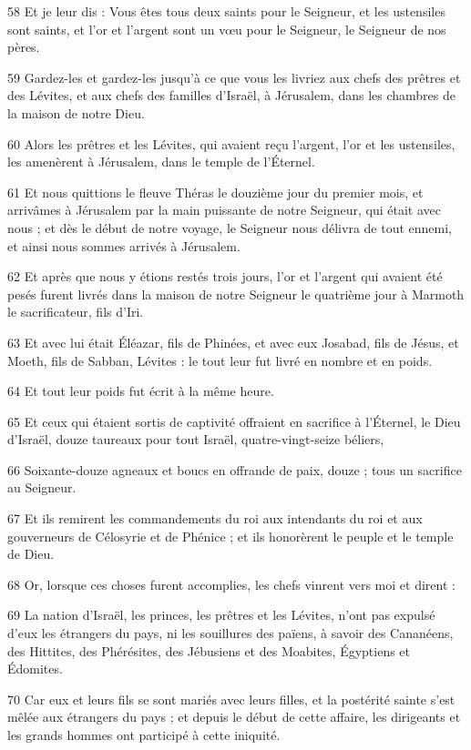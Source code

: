 \par 58 Et je leur dis : Vous êtes tous deux saints pour le Seigneur, et les ustensiles sont saints, et l'or et l'argent sont un vœu pour le Seigneur, le Seigneur de nos pères.
\par 59 Gardez-les et gardez-les jusqu'à ce que vous les livriez aux chefs des prêtres et des Lévites, et aux chefs des familles d'Israël, à Jérusalem, dans les chambres de la maison de notre Dieu.
\par 60 Alors les prêtres et les Lévites, qui avaient reçu l'argent, l'or et les ustensiles, les amenèrent à Jérusalem, dans le temple de l'Éternel.
\par 61 Et nous quittions le fleuve Théras le douzième jour du premier mois, et arrivâmes à Jérusalem par la main puissante de notre Seigneur, qui était avec nous ; et dès le début de notre voyage, le Seigneur nous délivra de tout ennemi, et ainsi nous sommes arrivés à Jérusalem.
\par 62 Et après que nous y étions restés trois jours, l'or et l'argent qui avaient été pesés furent livrés dans la maison de notre Seigneur le quatrième jour à Marmoth le sacrificateur, fils d'Iri.
\par 63 Et avec lui était Éléazar, fils de Phinées, et avec eux Josabad, fils de Jésus, et Moeth, fils de Sabban, Lévites : le tout leur fut livré en nombre et en poids.
\par 64 Et tout leur poids fut écrit à la même heure.
\par 65 Et ceux qui étaient sortis de captivité offraient en sacrifice à l'Éternel, le Dieu d'Israël, douze taureaux pour tout Israël, quatre-vingt-seize béliers,
\par 66 Soixante-douze agneaux et boucs en offrande de paix, douze ; tous un sacrifice au Seigneur.
\par 67 Et ils remirent les commandements du roi aux intendants du roi et aux gouverneurs de Célosyrie et de Phénice ; et ils honorèrent le peuple et le temple de Dieu.
\par 68 Or, lorsque ces choses furent accomplies, les chefs vinrent vers moi et dirent :
\par 69 La nation d'Israël, les princes, les prêtres et les Lévites, n'ont pas expulsé d'eux les étrangers du pays, ni les souillures des païens, à savoir des Cananéens, des Hittites, des Phérésites, des Jébusiens et des Moabites, Égyptiens et Édomites.
\par 70 Car eux et leurs fils se sont mariés avec leurs filles, et la postérité sainte s'est mêlée aux étrangers du pays ; et depuis le début de cette affaire, les dirigeants et les grands hommes ont participé à cette iniquité.
